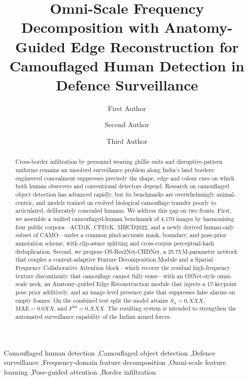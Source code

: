 \documentclass[3p,times,procedia]{elsarticle}
\newcommand{\oMAEcomb}{0.0XX}  \newcommand{\oSacomb}{0.XXX}  \newcommand{\oFbdcomb}{0.XXX}
\newcommand{\Fbd}{F^{\mathrm{bd}}}
\begin{document}
\begin{frontmatter}


\title{Omni-Scale Frequency Decomposition with Anatomy-Guided Edge Reconstruction for Camouflaged Human Detection in Defence Surveillance}

\author[a]{First Author}
\author[a]{Second Author}
\author[a]{Third Author}

\address[a]{Bytes Technolab, Ahmedabad, Gujarat 380015, India}

\begin{abstract}
Cross-border infiltration by personnel wearing ghillie suits and disruptive-pattern uniforms remains an unsolved surveillance problem along India's land borders: engineered concealment suppresses precisely the shape, edge and colour cues on which both human observers and conventional detectors depend. Research on camouflaged object detection has advanced rapidly, but its benchmarks are overwhelmingly animal-centric, and models trained on evolved biological camouflage transfer poorly to articulated, deliberately concealed humans. We address this gap on two fronts. First, we assemble a unified camouflaged-human benchmark of 4{,}170 images by harmonising four public corpora---ACD1K, CPD1K, MHCD2022, and a newly derived human-only subset of CAMO---under a common pixel-accurate mask, boundary, and pose-prior annotation scheme, with clip-aware splitting and cross-corpus perceptual-hash deduplication. Second, we propose OS-Res2Net-CHDNet, a 25.75\,M-parameter network that couples a content-adaptive Feature Decomposition Module and a Spatial--Frequency Collaborative Attention block---which recover the residual high-frequency texture discontinuity that camouflage cannot fully erase---with an OSNet-style omni-scale neck, an Anatomy-guided Edge Reconstruction module that injects a 17-keypoint pose prior additively, and an image-level presence gate that suppresses false alarms on empty frames. On the combined test split the model attains $S_\alpha=\oSacomb$, $\mathrm{MAE}=\oMAEcomb$, and $\Fbd=\oFbdcomb$. The resulting system is intended to strengthen the automated surveillance capability of the Indian armed forces.
\end{abstract}

\begin{keyword}
Camouflaged human detection \sep Camouflaged object detection \sep Defence surveillance \sep Frequency-domain feature decomposition \sep Omni-scale feature learning \sep Pose-guided attention \sep Border infiltration
\end{keyword}
\end{frontmatter}
\end{document}
